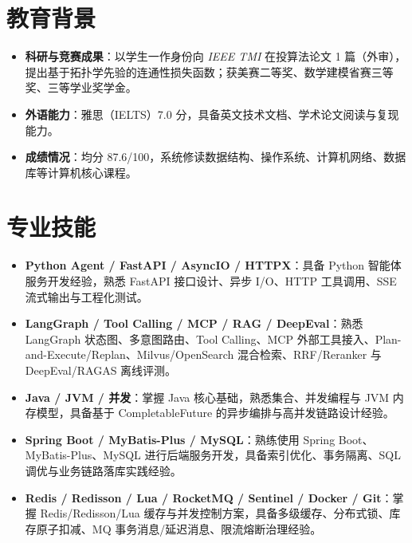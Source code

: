 \documentclass{resume}
\begin{document}

\noindent
{}

\vspace{-1.0em}

\section{教育背景}
\begin{itemize}[parsep=0.5ex]
    \item \textbf{科研与竞赛成果}：以学生一作身份向 \textit{IEEE TMI} 在投算法论文 1 篇（外审），提出基于拓扑学先验的连通性损失函数；获美赛二等奖、数学建模省赛三等奖、三等学业奖学金。
    \item \textbf{外语能力}：雅思（IELTS）7.0 分，具备英文技术文档、学术论文阅读与复现能力。
    \item \textbf{成绩情况}：均分 87.6/100，系统修读数据结构、操作系统、计算机网络、数据库等计算机核心课程。
\end{itemize}

\section{专业技能}
\begin{itemize}[parsep=0.5ex]
    \item \textbf{Python Agent / FastAPI / AsyncIO / HTTPX}：具备 Python 智能体服务开发经验，熟悉 FastAPI 接口设计、异步 I/O、HTTP 工具调用、SSE 流式输出与工程化测试。
    \item \textbf{LangGraph / Tool Calling / MCP / RAG / DeepEval}：熟悉 LangGraph 状态图、多意图路由、Tool Calling、MCP 外部工具接入、Plan-and-Execute/Replan、Milvus/OpenSearch 混合检索、RRF/Reranker 与 DeepEval/RAGAS 离线评测。
    \item \textbf{Java / JVM / 并发}：掌握 Java 核心基础，熟悉集合、并发编程与 JVM 内存模型，具备基于 CompletableFuture 的异步编排与高并发链路设计经验。
    \item \textbf{Spring Boot / MyBatis-Plus / MySQL}：熟练使用 Spring Boot、MyBatis-Plus、MySQL 进行后端服务开发，具备索引优化、事务隔离、SQL 调优与业务链路落库实践经验。
    \item \textbf{Redis / Redisson / Lua / RocketMQ / Sentinel / Docker / Git}：掌握 Redis/Redisson/Lua 缓存与并发控制方案，具备多级缓存、分布式锁、库存原子扣减、MQ 事务消息/延迟消息、限流熔断治理经验。
\end{itemize}
\end{document}
